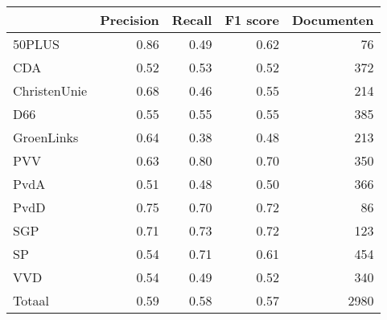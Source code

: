\begin{tabular}{lrrrr}
\toprule
{} &  Precision &  Recall &  F1 score &  Documenten \\
\midrule
50PLUS       &       0.86 &    0.49 &      0.62 &          76 \\
CDA          &       0.52 &    0.53 &      0.52 &         372 \\
ChristenUnie &       0.68 &    0.46 &      0.55 &         214 \\
D66          &       0.55 &    0.55 &      0.55 &         385 \\
GroenLinks   &       0.64 &    0.38 &      0.48 &         213 \\
PVV          &       0.63 &    0.80 &      0.70 &         350 \\
PvdA         &       0.51 &    0.48 &      0.50 &         366 \\
PvdD         &       0.75 &    0.70 &      0.72 &          86 \\
SGP          &       0.71 &    0.73 &      0.72 &         123 \\
SP           &       0.54 &    0.71 &      0.61 &         454 \\
VVD          &       0.54 &    0.49 &      0.52 &         340 \\
Totaal       &       0.59 &    0.58 &      0.57 &        2980 \\
\bottomrule
\end{tabular}
